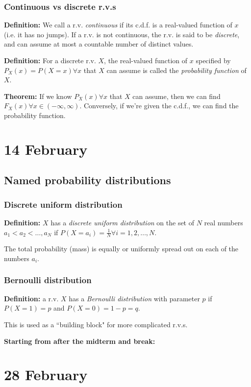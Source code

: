 \documentclass[12pt]{article}
\begin{document}
\subsubsection{Continuous vs discrete r.v.s}
\textbf{Definition:} We call a r.v. \emph{continuous} if its c.d.f. is a real-valued function of $x$ (i.e. it has no jumps). If a r.v. is not continuous, the r.v. is said to be \emph{discrete}, and can assume at most a countable number of distinct values.

\textbf{Definition:} For a discrete r.v. $X$, the real-valued function of $x$ specified by $P_X (x) = P(X = x) \forall x$ that $X$ can assume is called the \emph{probability function} of $X$.

\textbf{Theorem:} If we know $P_X (x) \forall x$ that $X$ can assume, then we can find $F_X (x) \forall x \in (-\infty, \infty)$. Conversely, if we're given the c.d.f., we can find the probability function.

\section{14 February} 
\subsection{Named probability distributions}
\subsubsection{Discrete uniform distribution}
\textbf{Definition:} $X$ has a \emph{discrete uniform distribution} on the set of $N$ real numbers $a_1 < a_2 < \dots, a_N$ if $P(X = a_i) = \frac{1}{N} \forall i = 1, 2, \dots, N$.

The total probability (mass) is equally or uniformly spread out on each of the numbers $a_i$. 

\subsubsection{Bernoulli distribution}
\textbf{Definition:} a r.v. $X$ has a \emph{Bernoulli distribution} with parameter $p$ if $P(X = 1) = p$ and $P(X = 0) = 1 - p = q$.

This is used as a ``building block" for more complicated r.v.s. 


\textbf{Starting from after the midterm and break:}

\section{28 February}
\end{document}
